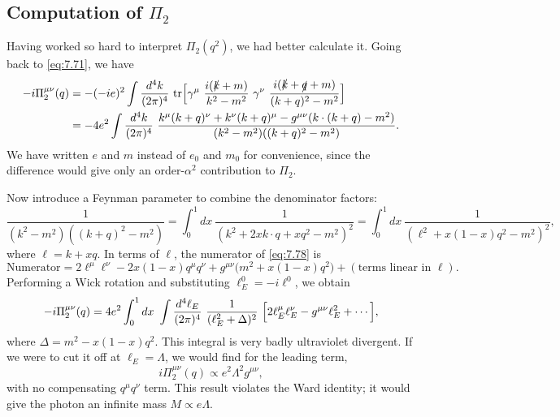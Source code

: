 \subsection{Computation of $\Pi_2$}

Having worked so hard to interpret $\Pi_2(q^2)$, we had better calculate it.
Going back to \eqref{eq:7.71}, we have
\begin{equation}
  \begin{aligned}
    -i\Pi^{\mu\nu}_2(q) &= -(-ie)^2 \int \frac{d^4k}{(2\pi)^4}\
      \mathrm{tr}\Bigl[ \gamma^\mu\ \frac{i(\slashed{k}+m)}{k^2-m^2}\
        \gamma^\nu\ \frac{i(\slashed{k}+\slashed{q}+m)}
          {(k+q)^2-m^2} \Bigr]\\
    &= -4e^2 \int \frac{d^4k}{(2\pi)^4}\
      \frac{k^\mu(k+q)^\nu + k^\nu(k+q)^\mu - g^{\mu\nu}
        (k\cdot(k+q) - m^2)}
        {(k^2-m^2)((k+q)^2-m^2)} .
  \end{aligned}
  \label{eq:7.78}
\end{equation}
We have written $e$ and $m$ instead of $e_0$ and $m_0$ for convenience, since
the difference would give only an order-$\alpha^2$ contribution to
$\Pi_2$.

Now introduce a Feynman parameter to combine the denominator factors:
\begin{equation}
  \frac{1}{(k^2-m^2)((k+q)^2-m^2)}
  = \int_0^1 dx\ \frac{1}{(k^2 + 2xk\cdot q + xq^2 - m^2)^2}
  = \int_0^1 dx\ \frac{1}{(\ell^2 + x(1-x)q^2 - m^2)^2},
\end{equation}
where $\ell = k + xq$.  In terms of $\ell$, the numerator of \eqref{eq:7.78}
is
\begin{equation}
  \text{Numerator} = 2\ell^\mu\ell^\nu - 2x(1-x)q^\mu q^\nu
    + g^{\mu\nu}\bigl( m^2 + x(1-x)q^2 \bigr)
    + (\text{terms linear in } \ell) .
\end{equation}
Performing a Wick rotation and substituting $\ell_E^0 = -i\ell^0$, we obtain
\begin{equation}
  -i\Pi^{\mu\nu}_2(q) = 4e^2 \int_0^1 dx\ \int
    \frac{d^4\ell_E}{(2\pi)^4}\ \frac{1}{(\ell_E^2+\Delta)^2}\
    \Bigl[ 2\ell_E^\mu\ell_E^\nu - g^{\mu\nu}\ell_E^2 + \cdots \Bigr],
  \label{eq:7.79}
\end{equation}
where $\Delta = m^2 - x(1-x)q^2$.  This integral is very badly ultraviolet
divergent.  If we were to cut it off at $\ell_E = \Lambda$, we would find for
the leading term,
\begin{equation}
  i\Pi^{\mu\nu}_2(q) \propto e^2\Lambda^2 g^{\mu\nu},
\end{equation}
with no compensating $q^\mu q^\nu$ term.  This result violates the Ward
identity; it would give the photon an infinite mass $M \propto e\Lambda$.

